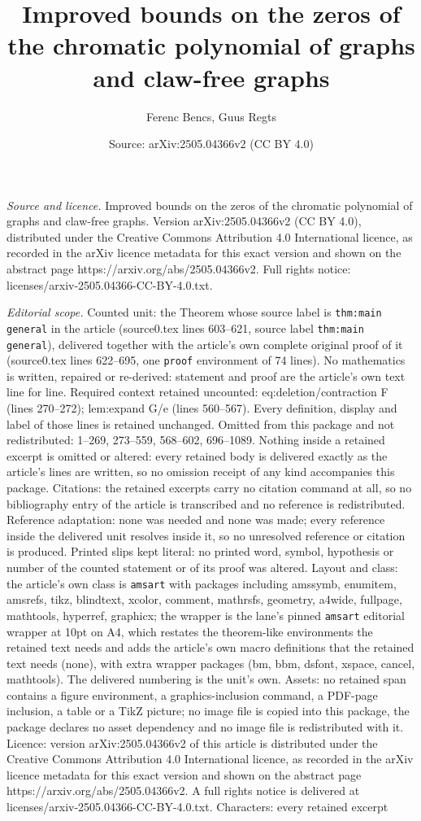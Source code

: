 \documentclass[10pt,a4paper]{amsart}
\title[Improved bounds on the zeros of the chromatic polynomial of ]{Improved bounds on the zeros of the chromatic polynomial of graphs and claw-free graphs}
\author{Ferenc Bencs, Guus Regts}
\date{Source: arXiv:2505.04366v2 (CC BY 4.0)}
\begin{document}
\maketitle

\noindent\emph{Source and licence.} Improved bounds on the zeros of the chromatic polynomial of graphs and claw-free graphs. Version arXiv:2505.04366v2 (CC BY 4.0), distributed under the Creative Commons Attribution 4.0 International licence, as recorded in the arXiv licence metadata for this exact version and shown on the abstract page https://arxiv.org/abs/2505.04366v2. Full rights notice: licenses/arxiv-2505.04366-CC-BY-4.0.txt.\par\smallskip

\noindent\textit{Editorial scope.} Counted unit: the Theorem whose source label is \texttt{thm:main general} in the article (source0.tex lines 603--621, source label \texttt{thm:main general}), delivered together with the article's own complete original proof of it (source0.tex lines 622--695, one \texttt{proof} environment of 74 lines). No mathematics is written, repaired or re-derived: statement and proof are the article's own text line for line. Required context retained uncounted: eq:deletion/contraction F (lines 270--272); lem:expand G/e (lines 560--567). Every definition, display and label of those lines is retained unchanged. Omitted from this package and not redistributed: 1--269, 273--559, 568--602, 696--1089. Nothing inside a retained excerpt is omitted or altered: every retained body is delivered exactly as the article's lines are written, so no omission receipt of any kind accompanies this package. Citations: the retained excerpts carry no citation command at all, so no bibliography entry of the article is transcribed and no reference is redistributed. Reference adaptation: none was needed and none was made; every reference inside the delivered unit resolves inside it, so no unresolved reference or citation is produced. Printed slips kept literal: no printed word, symbol, hypothesis or number of the counted statement or of its proof was altered. Layout and class: the article's own class is \texttt{amsart} with packages including amssymb, enumitem, amsrefs, tikz, blindtext, xcolor, comment, mathrsfs, geometry, a4wide, fullpage, mathtools, hyperref, graphicx; the wrapper is the lane's pinned \texttt{amsart} editorial wrapper at 10pt on A4, which restates the theorem-like environments the retained text needs and adds the article's own macro definitions that the retained text needs (none), with extra wrapper packages (bm, bbm, dsfont, xspace, cancel, mathtools). The delivered numbering is the unit's own. Assets: no retained span contains a figure environment, a graphics-inclusion command, a PDF-page inclusion, a table or a TikZ picture; no image file is copied into this package, the package declares no asset dependency and no image file is redistributed with it. Licence: version arXiv:2505.04366v2 of this article is distributed under the Creative Commons Attribution 4.0 International licence, as recorded in the arXiv licence metadata for this exact version and shown on the abstract page https://arxiv.org/abs/2505.04366v2. A full rights notice is delivered at licenses/arxiv-2505.04366-CC-BY-4.0.txt. Characters: every retained excerpt 
\end{document}
